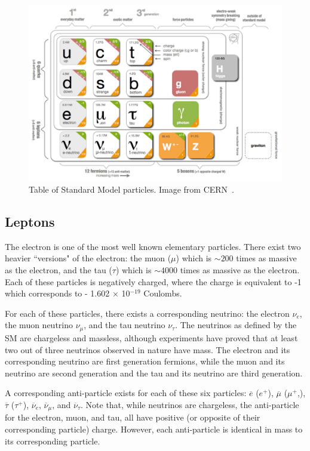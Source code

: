 \begin{figure}[h]
    \centering
        \includegraphics[width=\textwidth]{F1/StandardModelTable}
        \caption{Table of Standard Model particles. Image from CERN~\cite{SMTable}.}
        \label{Fig:Intro:SMTable}
\end{figure}

\clearpage
\subsection{Leptons}
The electron is one of the most well known elementary particles. There exist two heavier ``versions" of the electron: the muon ($\mu$) which is $\sim 200$ times as massive as the electron, and the tau ($\tau$) which is $\sim 4000$ times as massive as the electron. Each of these particles is negatively charged, where the charge is equivalent to -1 which corresponds to - 1.602 $\times$ 10$^{-19}$ Coulombs. 

For each of these particles, there exists a corresponding neutrino: the electron $\nu_e$, the muon neutrino $\nu_\mu$, and the tau neutrino $\nu_\tau$. The neutrinos as defined by the SM are chargeless and massless, although experiments have proved that at least two out of three neutrinos observed in nature have mass. The electron and its corresponding neutrino are first generation fermions, while the muon and its neutrino are second generation and the tau and its neutrino are third generation. 

A corresponding anti-particle exists for each of these six particles: $\overline{e}$ ($e^+$), $\overline{\mu}$ ($\mu^+$,), $\overline{\tau}$ ($\tau^+$), $\overline{\nu}_e$, $\overline{\nu}_\mu$, and $\overline{\nu}_\tau$. Note that, while neutrinos are chargeless, the anti-particle for the electron, muon, and tau, all have positive (or opposite of their corresponding particle) charge. However, each anti-particle is identical in mass to its corresponding particle.

